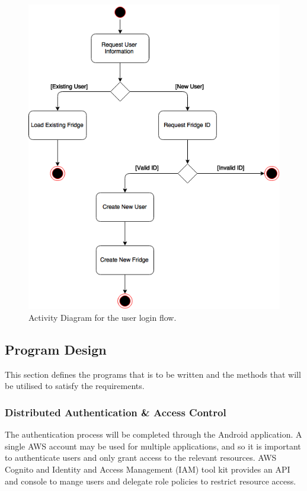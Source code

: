 \documentclass[a4paper, 11pt]{article}
\begin{document}
\begin{figure}[!htbp]
\centering
\includegraphics[width=\textwidth]{LoginActivity}
\caption{Activity Diagram for the user login flow.} \label{fig:LoginActivity}
\end{figure}


\vspace{\baselineskip}
\vspace{\baselineskip}

\subsection{Program Design}
This section defines the programs that is to be written and the methods that will be utilised to satisfy the requirements.


\subsubsection{Distributed Authentication \& Access Control}
The authentication process will be completed through the Android application. A single AWS account may be used for multiple applications, and so it is important to authenticate users and only grant access to the relevant resources. AWS Cognito and Identity and Access Management (IAM) tool kit provides an API and console to mange users and delegate role policies to restrict resource access. 
\end{document}
